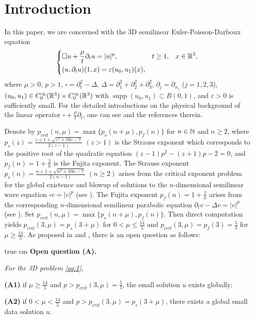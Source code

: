 \documentclass[11pt,twoside]{article}
\newcommand{\p}{\partial}
\newcommand{\ve}{\varepsilon}
\newcommand{\f}{\frac}
\theoremstyle{plain}
\theoremstyle{definition}
\theoremstyle{remark}
\numberwithin{equation}{section}
\begin{document}
\section{Introduction}\label{Sec1}
In this paper, we are concerned with the 3D semilinear Euler-Poisson-Darboux equation
\begin{equation}
\label{qq:1}
\left\{
\begin{aligned}
&\square u+\f{\mu}{t}\p_tu=|u|^p,
&&t\geq1,&x\in\Bbb R^3,\\
&(u,\p_tu)(1,x)=\ve(u_0,u_1)(x),
\end{aligned}
\right.
\end{equation}
where $\mu>0$, $p>1$, $\square=\p_t^2-\Delta$,
$\Delta=\p_1^2+\p_2^2+\p_3^2$, $\p_j=\p_{x_j}$ ($j=1,2,3$),
$(u_0,u_1)\in C_0^\infty(\Bbb R^3)\times C_0^\infty(\Bbb R^3)$ with
$\operatorname{supp}(u_0,u_1)\subset B(0,1)$, and $\ve>0$ is sufficiently small.
For the detailed introductions on
the physical background of the linear operator
$\square+\f{\mu}{t}\p_t$, one can see \cite{LWY} and the references therein.

Denote by $p_{crit}(n,\mu)=\max\{p_s(n+\mu),p_f(n)\}$ for $n\in\Bbb N$ and $n\ge 2$, where
$p_s(z)=\f{z+1+\sqrt{z^2+10z-7}}{2(z-1)}$ $(z>1)$ is the Strauss
exponent which corresponds to the positive root of the quadratic equation
$(z-1)p^2-(z+1)p-2=0$, and $p_f(n)=1+\f{2}{n}$ is the Fujita exponent.
The Strauss exponent
$p_s(n)=\f{n+1+\sqrt{n^2+10n-7}}{2(n-1)}$ $(n\geq2)$ arises from the critical
exponent problem for the global existence and blowup of
solutions to the $n$-dimensional  semilinear wave equation
$\square v=|v|^p$ (see \cite{Strauss}). The Fujita exponent
$p_f(n)=1+\f{2}{n}$ arises from the corresponding $n$-dimensional
semilinear parabolic equation
$\partial_tv-\Delta v=|v|^p$ (see \cite{Fuj}).
Set $p_{crit}(n,\mu)=\max\{p_s(n+\mu), p_f(n)\}$. Then direct computation
yields $p_{crit}(3,\mu)=p_s(3+\mu)$ for $0<\mu\le\f{14}{5}$ and
$p_{crit}(3,\mu)=p_f(3)=\f{5}{3}$ for $\mu\geq\f{14}{5}$.
As proposed in \cite{Rei1,Imai} and \cite{LY-2}, there is an open question as follows:

 true cm
\noindent
{\bf Open question (A).}
{\it For the 3D problem \eqref{qq:1},

\noindent
{\bf (A1)} if $\mu\geq\f{14}{5}$ and
$p>p_{crit}(3,\mu)=\f{5}{3}$, the small solution $u$ exists globally;

\noindent
{\bf (A2)} if $0<\mu<\f{14}{5}$ and
$p>p_{crit}(3,\mu)=p_s(3+\mu)$, there exists a global small data solution $u$.
}
\end{document}
